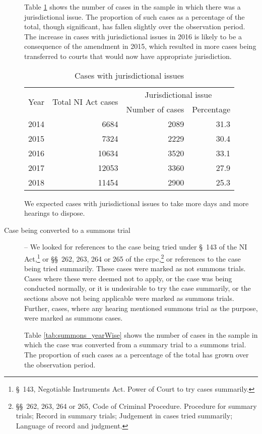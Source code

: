 \begin{description}
Table \ref{tab:jurisdiction_yearWise} shows the number of cases in the sample in which there was a jurisdictional issue. The proportion of such cases as a percentage of the total, though significant, has fallen slightly over the observation period. The increase in cases with jurisdictional issues in 2016 is likely to be a consequence of the amendment in 2015, which resulted in more cases being transferred to courts that would now have appropriate jurisdiction.

\begin{longtable}{@{}lrrr@{}}
 \caption{Cases with jurisdictional issues}\label{tab:jurisdiction_yearWise}\\
 \toprule
 \multirow{2}{*}{Year} & \multirow{2}{*}{Total NI Act cases} & \multicolumn{2}{c}{Jurisdictional issue}\\
 \cmidrule{3-4}
 && Number of cases & Percentage \\
 \midrule\endhead
 2014 & 6684 & 2089 & 31.3 \\
 2015 & 7324 & 2229 & 30.4 \\
 2016 & 10634 & 3520 & 33.1 \\
 2017 & 12053 & 3360 & 27.9 \\
 2018 & 11454 & 2900 & 25.3 \\
 \bottomrule
\end{longtable}

We expected cases with jurisdictional issues to take more days and more hearings to dispose. 

\item[]

\item [Case being converted to a summons trial] -- We looked for references to the case being tried under \S~143 of the NI Act,\footnote{\S~143, Negotiable Instruments Act. Power of Court to try cases summarily.} or \S\S~262, 263, 264 or 265 of the \gls{crpc},\footnote{\S\S~262, 263, 264 or 265, Code of Criminal Procedure. Procedure for summary trials; Record in summary trials; Judgement in cases tried summarily; Language of record and judgment.} or references to the case being tried summarily. These cases were marked as not summons trials. Cases where these were deemed not to apply, or the case was being conducted normally, or it is undesirable to try the case summarily, or the sections above not being applicable were marked as summons trials. Further, cases, where any hearing mentioned summons trial as the purpose, were marked as summons cases.

Table \ref{tab:summons_yearWise} shows the number of cases in the sample in which the case was converted from a summary trial to a summons trial. The proportion of such cases as a percentage of the total has grown over the observation period.


\end{description}
